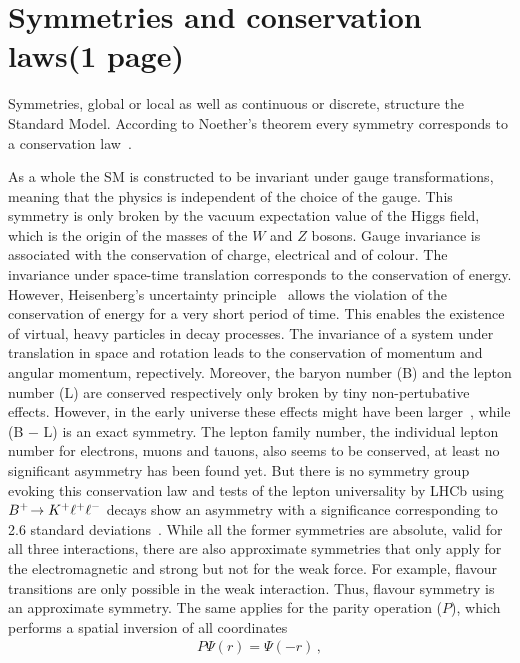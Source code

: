 
\section{Symmetries and conservation laws(1 page)}
\label{sec:standardmodel:symmetries}

Symmetries, global or local as well as continuous or discrete, structure the
Standard Model. According to Noether's theorem every symmetry corresponds to a
conservation law~\cite{Noether}.

As a whole the SM is constructed to be invariant under gauge transformations,
meaning that the physics is independent of the choice of the gauge. This
symmetry is only broken by the vacuum expectation value of the Higgs field,
which is the origin of the masses of the $W$ and $Z$ bosons. Gauge invariance
is associated with the conservation of charge, electrical and of colour. The
invariance under space-time translation corresponds to the conservation of
energy. However, Heisenberg's uncertainty principle~\cite{Heisenberg:1927zz}
allows the violation of the conservation of energy for a very short period of
time. This enables the existence of virtual, heavy particles in decay
processes. The invariance of a system under translation in space and rotation
leads to the conservation of momentum and angular momentum, repectively.
Moreover, the baryon number (B) and the lepton number (L) are conserved
respectively only broken by tiny non-pertubative effects. However, in the
early universe these effects might have been larger~\cite{Rubakov:1996vz},
while (B $-$ L) is an exact symmetry. The lepton family number, \ie the
individual lepton number for electrons, muons and tauons, also seems to be
conserved, at least no significant asymmetry has been found yet. But there is
no symmetry group evoking this conservation law and tests of the lepton
universality by LHCb using \mbox{${{B}^+}\!\rightarrow {\ensuremath{{K}^+}}\ell^+\ell^-$} decays show an
asymmetry with a significance corresponding to \num{2.6} standard
deviations~\cite{LHCb-PAPER-2014-024}. While all the former symmetries are
absolute, \ie valid for all three interactions, there are also approximate
symmetries that only apply for the electromagnetic and strong but not for the
weak force. For example, flavour transitions are only possible in the weak
interaction. Thus, flavour symmetry is an approximate symmetry. The same
applies for the parity operation ($P$), which performs a spatial inversion of
all coordinates
\begin{align}
	P\Psi(r) = \Psi(-r)\,,
\end{align}
